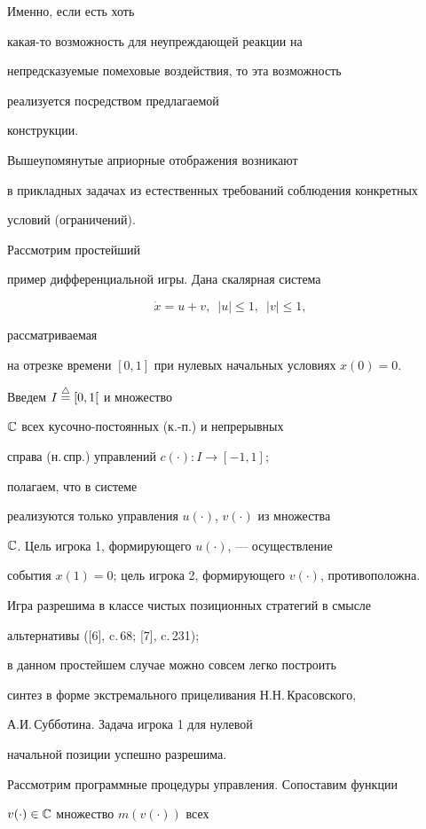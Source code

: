 Именно, если есть хоть


какая-то возможность для неупреждающей реакции на


непредсказуемые помеховые воздействия, то эта возможность


реализуется посредством предлагаемой


конструкции.


Вышеупомянутые априорные отображения возникают


в прикладных задачах из естественных требований соблюдения конкретных


условий (ограничений).


Рассмотрим простейший


пример дифференциальной игры. Дана скалярная система


$$


\Dot x = u + v,\ \; | u | \le 1,\ \;| v | \le 1,


$$


рассматриваемая


на отрезке времени $[0,1]$ при нулевых начальных условиях $x(0) = 0$.


Введем $I \overset{\triangle}{=}{} [0,1[$ и множество


${\Bbb C}$ всех кусочно-постоянных (к.-п.) и непрерывных


справа (н.\,спр.) управлений $c(\cdot):I \longrightarrow [-1,1]$;


полагаем, что в системе


реализуются только управления $u(\cdot)$, $v(\cdot)$ из множества


${\Bbb C}$. Цель игрока 1, формирующего $u(\cdot)$, --- осуществление


события $x(1) = 0$; цель игрока 2, формирующего $v(\cdot)$, противоположна.


Игра разрешима в классе чистых позиционных стратегий в смысле


альтернативы ([6], c.\,68; [7], c.\,231);


в данном простейшем случае можно совсем легко построить


синтез в форме экстремального прицеливания Н.Н.\,Красовского,


А.И.\,Субботина. Задача игрока 1 для нулевой


начальной позиции успешно разрешима.


Рассмотрим программные процедуры управления. Сопоставим функции


$v(\cdot) \in {\Bbb C}$ множество $m(v(\cdot))$ всех


